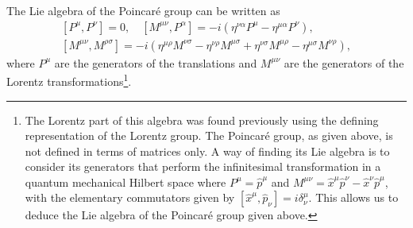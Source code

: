 The Lie algebra of the Poincaré group can be written as
\begin{equation}
    \begin{aligned}
        [P^\mu, P^\nu] = 0, \quad [M^{\mu\nu}, P^\alpha] = -i (\eta^{\nu\alpha} P^\mu - \eta^{\mu\alpha} P^\nu), \\
        [M^{\mu\nu}, M^{\rho\sigma}] = -i (\eta^{\mu\rho} M^{\nu\sigma} - \eta^{\nu\rho} M^{\mu\sigma} + \eta^{\nu\sigma} M^{\mu\rho} - \eta^{\mu\sigma} M^{\nu\rho}),
    \end{aligned}
    \label{eq:Poincare_Lie_algebra}
\end{equation}
where $P^\mu$ are the generators of the translations and $M^{\mu\nu}$ are the generators of the Lorentz transformations\footnote{The Lorentz part of this algebra was found previously using the defining representation of the Lorentz group. The Poincaré group, as given above, is not defined in terms of matrices only. A way of finding its Lie algebra is to consider its generators that perform the infinitesimal transformation in a quantum mechanical Hilbert space where $P^\mu = \hat{p}^\mu$ and $M^{\mu\nu} = \hat{x}^\mu \hat{p}^\nu - \hat{x}^\nu \hat{p}^\mu$, with the elementary commutators given by $[\hat{x}^\mu, \hat{p}_\nu] = i \delta^{\mu}_{\nu}$. This allows us to deduce the Lie algebra of the Poincaré group given above.}.

